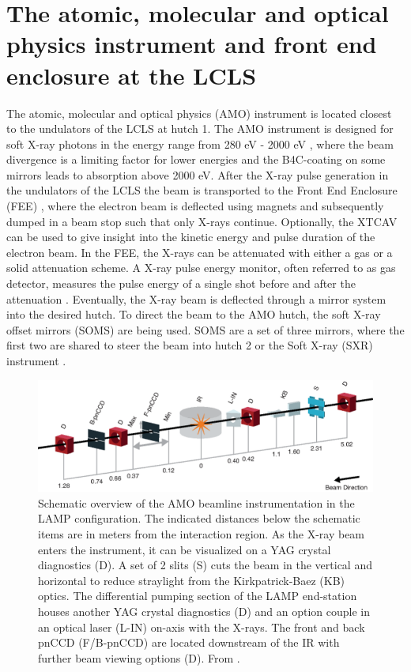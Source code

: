 \section{The atomic, molecular and optical physics instrument and front end enclosure at the LCLS}\label{sec:amo-instrument}
The atomic, molecular and optical physics (AMO) instrument is located closest to the undulators of the LCLS at hutch 1. The AMO instrument is designed for soft X-ray photons in the energy range from 280 eV - 2000 eV \citep{Ferguson-2015-JSR,Bozek-2009-EPJST}, where the beam divergence is a limiting factor for lower energies and the B4C-coating on some mirrors leads to absorption above 2000 eV. After the X-ray pulse generation in the undulators of the LCLS the beam is transported to the Front End Enclosure (FEE) \citep{Moeller-2011-NIMPR}, where the electron beam is deflected using magnets and subsequently dumped in a beam stop such that only X-rays continue. Optionally, the XTCAV \citep{Behrens-2014-NatCom} can be used to give insight into the kinetic energy and pulse duration of the electron beam. In the FEE, the X-rays can be attenuated with either a gas or a solid attenuation scheme. A X-ray pulse energy monitor, often referred to as gas detector, measures the pulse energy of a single shot before and after the attenuation \citep{Hau-Riege-2010-PRL-2}. Eventually, the X-ray beam is deflected through a mirror system into the desired hutch. To direct the beam to the AMO hutch, the soft X-ray offset mirrors (SOMS) are being used. SOMS are a set of three mirrors, where the first two are shared to steer the beam into hutch 2 or the Soft X-ray (SXR) instrument \citep{Schlotter-2012-RSI,Soufli-2012-AppOpt,Dakovski-2015-JSR}.
\begin{figure}
	\centering
		\includegraphics[width=1.00\textwidth]{images/beam_layout.eps}
	\caption[Schematic overview of the AMO beamline instrumentation.]{Schematic overview of the AMO beamline instrumentation in the LAMP configuration. The indicated distances below the schematic items are in meters from the interaction region. As the X-ray beam enters the instrument, it can be visualized on a YAG crystal diagnostics (D). A set of 2 slits (S) cuts the beam in the vertical and horizontal to reduce straylight from the Kirkpatrick-Baez (KB) optics. The differential pumping section of the LAMP end-station houses another YAG crystal diagnostics (D) and an option couple in an optical laser (L-IN) on-axis with the X-rays. The front and back pnCCD (F/B-pnCCD) are located downstream of the IR with further beam viewing options (D). From \citep{Ferguson-2015-JSR}.}
	\label{fig:beam_layout}
\end{figure}
